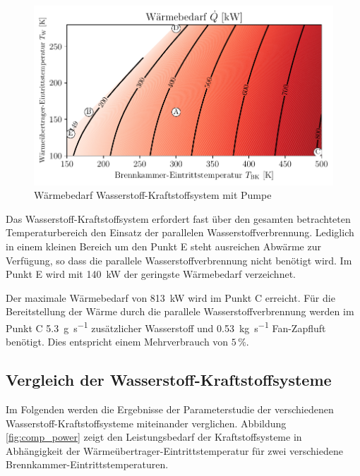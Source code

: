 \begin{figure}[ht]
\centering
\includegraphics[width=1\linewidth]{4_Abbildungen/2_Hauptteil/Ergebnisse/Pumpeheatcontour.pdf}
  \caption{Wärmebedarf Wasserstoff-Kraftstoffsystem mit Pumpe}
  \label{fig:pumpheat}
\end{figure}
\FloatBarrier

Das Wasserstoff-Kraftstoffsystem erfordert fast über den gesamten betrachteten Temperaturbereich den Einsatz der parallelen Wasserstoffverbrennung. Lediglich in einem kleinen Bereich um den Punkt E steht ausreichen Abwärme zur Verfügung, so dass die parallele Wasserstoffverbrennung nicht benötigt wird. Im Punkt E wird mit \SI{140}{\kilo\W} der geringste Wärmebedarf verzeichnet.

Der maximale Wärmebedarf von \SI{813}{\kilo\W} wird im Punkt C erreicht. Für die Bereitstellung der Wärme durch die parallele Wasserstoffverbrennung werden im Punkt C \SI{5.3}{\g\per\s} zusätzlicher Wasserstoff und \SI{0.53}{\kg\per\s} Fan-Zapfluft benötigt. Dies entspricht einem Mehrverbrauch von $5\,\%$.


\subsection{Vergleich der Wasserstoff-Kraftstoffsysteme}

Im Folgenden werden die Ergebnisse der Parameterstudie der verschiedenen Wasserstoff-Kraftstoffsysteme miteinander verglichen. Abbildung \ref{fig:comp_power} zeigt den Leistungsbedarf der Kraftstoffsysteme in Abhängigkeit der Wärmeübertrager-Eintrittstemperatur für zwei verschiedene Brennkammer-Eintrittstemperaturen.

